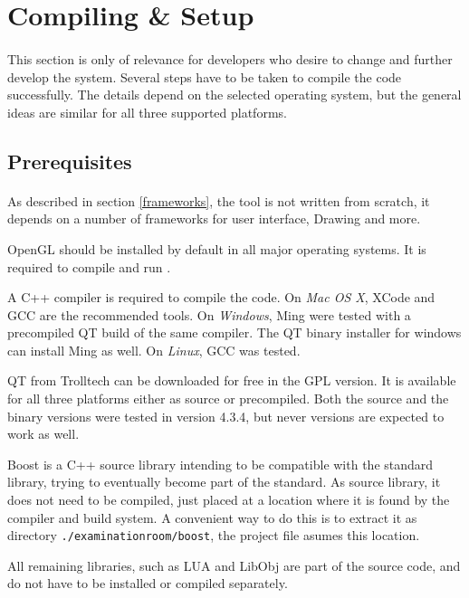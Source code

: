 \section{Compiling \& Setup}
\paragraph{}
This section is only of relevance for developers who desire to change and further develop the system. Several steps have to be taken to compile the code successfully.
The details depend on the selected operating system, but the general ideas are similar for all three supported platforms.

\subsection{Prerequisites}
\paragraph{}
As described in section \ref{frameworks}, the tool is not written from scratch, it depends on a number of frameworks for user interface, Drawing and more.

OpenGL should be installed by default in all major operating systems. It is required to compile and run \ER.

A C++ compiler is required to compile the code.
On \textit{Mac OS X}, XCode and GCC are the recommended tools.
On \textit{Windows}, Ming were tested with a precompiled QT build of the same compiler.
The QT binary installer for windows can install Ming as well.
On \textit{Linux}, GCC was tested.

QT from Trolltech can be downloaded for free in the GPL version\cite{qt}.
It is available for all three platforms either as source or precompiled.
Both the source and the binary versions were tested in version 4.3.4, but never versions are expected to work as well.

Boost is a C++ source library intending to be compatible with the standard library, trying to eventually become part of the standard\cite{boost}.
As source library, it does not need to be compiled, just placed at a location where it is found by the compiler and build system.
A convenient way to do this is to extract it as directory \texttt{./examinationroom/boost}, the project file asumes this location.

All remaining libraries, such as LUA and LibObj are part of the source code, and do not have to be installed or compiled separately.


